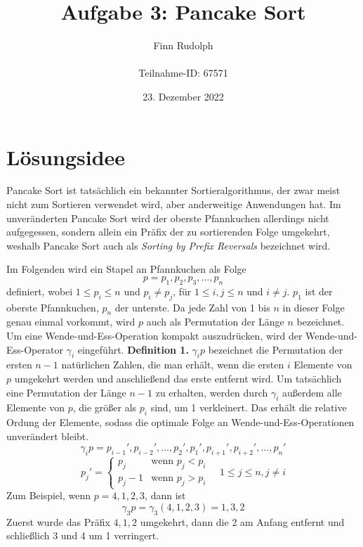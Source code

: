 \documentclass[a4paper, 11pt, ngerman]{article}
\title{\Huge Aufgabe 3: Pancake Sort}
\author{\Large Finn Rudolph \\ \\ \Large Teilnahme-ID: 67571}
\date{\Large 23. Dezember 2022}
\begin{document}
\begin{titlepage}
    \maketitle
    \thispagestyle{empty}
\end{titlepage}

\tableofcontents
\thispagestyle{empty}
\newpage

\section{Lösungsidee}

Pancake Sort ist tatsächlich ein bekannter Sortieralgorithmus, der zwar meist nicht zum Sortieren verwendet wird, aber anderweitige Anwendungen hat. Im unveränderten Pancake Sort wird der oberste Pfannkuchen allerdings nicht aufgegessen, sondern allein ein Präfix der zu sortierenden Folge umgekehrt, weshalb Pancake Sort auch als \emph{Sorting by Prefix Reversals} bezeichnet wird.

Im Folgenden wird ein Stapel an Pfannkuchen als Folge
$$
    p = p_1, p_2, p_3, \dots, p_n
$$
definiert, wobei $1 \le p_i \le n$ und $p_i \ne p_j$, für $1 \le i, j \le n$ und $i \ne j$. $p_1$ ist der oberste Pfannkuchen, $p_n$ der unterste. Da jede Zahl von 1 bis $n$ in dieser Folge genau einmal vorkommt, wird $p$ auch als Permutation der Länge $n$ bezeichnet. Um eine Wende-und-Ess-Operation kompakt auszudrücken, wird der Wende-und-Ess-Operator $\gamma_i$ eingeführt.
\newline \newline
\textbf{Definition 1.} $\gamma_i p$ bezeichnet die Permutation der ersten $n - 1$ natürlichen Zahlen, die man erhält, wenn die ersten $i$ Elemente von $p$ umgekehrt werden und anschließend das erste entfernt wird. Um tatsächlich eine Permutation der Länge $n - 1$ zu erhalten, werden durch $\gamma_i$ außerdem alle Elemente von $p$, die größer als $p_i$ sind, um 1 verkleinert. Das erhält die relative Ordung der Elemente, sodass die optimale Folge an Wende-und-Ess-Operationen unverändert bleibt.
$$
    \gamma_i p = p_{i-1}', p_{i-2}', \dots, p_2', p_1', p_{i+1}', p_{i+2}', \dots, p_n'
$$
$$
    p_j' = \begin{cases}
        p_j     & \text{wenn } p_j < p_i \\
        p_j - 1 & \text{wenn } p_j > p_i
    \end{cases}
    \quad 1 \le j \le n, j \ne i
$$
\newline \newline
Zum Beispiel, wenn $p = 4, 1, 2, 3$, dann ist
$$
    \gamma_3 p = \gamma_3 (4, 1, 2, 3) = 1, 3, 2
$$
Zuerst wurde das Präfix $4, 1, 2$ umgekehrt, dann die 2 am Anfang entfernt und schließlich 3 und 4 um 1 verringert.
\end{document}
